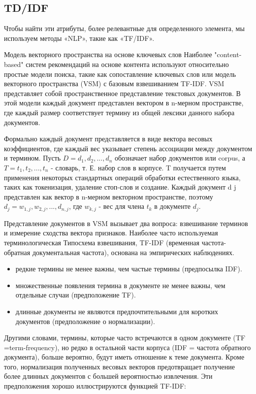 \subsection{TD/IDF}
Чтобы найти эти атрибуты, более релевантные для определенного элемента, мы используем методы «NLP», такие как «TF/IDF».

Модель векторного пространства на основе ключевых слов
Наиболее "content-based" систем рекомендаций на основе контента используют относительно простые модели поиска, такие как сопоставление ключевых слов или модель векторного пространства (VSM) с базовым взвешиванием TF-IDF. VSM представляет собой пространственное представление текстовых документов. В этой модели каждый документ представлен вектором в n-мерном пространстве, где каждый размер соответствует термину из общей лексики данного набора документов.

Формально каждый документ представляется в виде вектора весовых коэффициентов, где каждый вес указывает степень ассоциации между документом и термином. Пусть $D=  d_{1},d_{2},...,d_{n}$ обозначает набор документов или corpus, а $T=  t_{1},t_{2},...,t_{n}$ - словарь, т. Е. набор слов в корпусе. T получается путем применения некоторых стандартных операций обработки естественного языка, таких как токенизация, удаление стоп-слов и создание. Каждый документ d j представлен как вектор в n-мерном векторном пространстве, поэтому  $d_{j}=  w_{1,j},w_{2,j},...,d_{n,j} $, где $w_{k,j}$ - вес для члена $t_{k}$ в документе $d_{j}$.

Представление документов в VSM вызывает два вопроса: взвешивание терминов и измерение сходства вектора признаков. Наиболее часто используемая терминологическая Типосхема взвешивания, TF-IDF (временная частота-обратная документальная частота), основана на эмпирических наблюдениях.


\begin{itemize}
    \item редкие термины не менее важны, чем частые термины (предпосылка IDF).
    \item множественные появления термина в документе не менее важны, чем отдельные случаи (предположение TF).
    \item длинные документы не являются предпочтительными для коротких документов (предположение о нормализации).
\end{itemize}


Другими словами, термины, которые часто встречаются в одном документе (TF =term-frequency), но редко в остальной части корпуса (IDF = частота обратного документа), больше вероятно, будут иметь отношение к теме документа. Кроме того, нормализация полученных весовых векторов предотвращает получение более длинных документов с большей вероятностью извлечения. Эти предположения хорошо иллюстрируются функцией TF-IDF:




